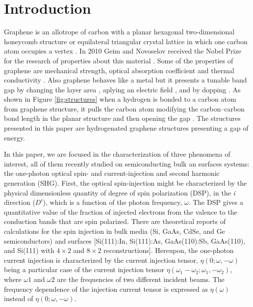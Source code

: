 \documentclass[aps,pra,11pt,tightenlines,showpacs,superscriptaddress,groupedaddress]{revtex4-1}
\begin{document}

\section{Introduction}\label{sec:intro}


Graphene is an allotrope of carbon with a planar hexagonal two-dimensional
honeycomb structure or equilateral triangular crystal lattice in which one
carbon atom occupies a vertex \cite{geim2007rise}. In 2010 Geim and Novoselov
received the Nobel Prize for the research of properties about this material
\cite{geim2007rise}. Some of the properties of graphene are mechanical
strength, optical absorption coefficient and thermal conductivity
\cite{geim2007rise, nair2008fine}. Also graphene behaves like a metal
\cite{geim2007rise} but it presents a tunable band gap by changing the layer
area \cite{han2007energy}, aplying an electric field \cite{zhang2009direct},
and by dopping \cite{ohta2006controlling,
elias2009control,guisinger2009exposure,samarakoon2010tunable}. As shown in
Figure \ref{fig:structures} when a hydrogen is bonded to a carbon atom from
graphene structure, it pulls the carbon atom modifying the carbon--carbon bond
length in the planar structure and then opening the gap
\cite{samarakoon2010tunable}. The structures presented in this paper are
hydrogenated graphene structures presenting a gap of energy.


In this paper, we are focused in the characterization of three phenomena of
interest, all of them recently studied on semiconducting bulk an surfaces
systems: the one-photon optical spin- and current-injection and  second
harmonic generation (SHG). First, the optical spin-injection might be
characterized by the physical dimensionless quantity of degree of spin
polarization (DSP), in the \emph{i} direction ($D^{i}$), which is a function of
the photon frequency, $\omega$. The DSP gives a quantitative value of the
fraction of injected electrons from the valence to the conduction bands that
are spin polarized. There are theoretical reports of calculations for the spin
injection in bulk media  (Si, GaAs, CdSe, and Ge semiconductors)
\cite{nastos2007full,cabellos2009stress,rioux2010optical} and surfaces
[Si(111):In, Si(111):As, GaAs(110):Sb, GaAs(110), and Si(111) with $4\times2$
and $8\times2$ reconstructions]\cite{mendoza2012optical,arzate2014optical}.
Hereupon, the one-photon current injection is characterized by the current
injection tensor, $\eta(0;\omega,-\omega)$  being a particular case of the
current injection tensor $\eta(\omega_{1}-\omega_{2};\omega_{1},-\omega_{2})$,
where $\omega{1}$ and $\omega{2}$ are the frequencies of two different incident
beams. The frequency dependence of the injection current tensor is expressed as
$\eta(\omega)$ instead of $\eta(0;\omega,-\omega)$.
\end{document}
